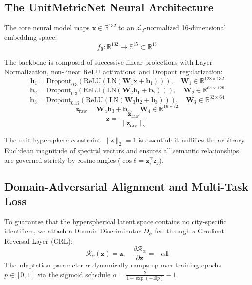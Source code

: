 \documentclass[11pt,a4paper]{article}
\begin{document}
\subsection{The UnitMetricNet Neural Architecture}
The core neural model maps $\mathbf{x} \in \mathbb{R}^{132}$ to an $\mathcal{L}_2$-normalized 16-dimensional embedding space:
\begin{equation}
    f_{\boldsymbol{\theta}}: \mathbb{R}^{132} \longrightarrow \mathbb{S}^{15} \subset \mathbb{R}^{16}
\end{equation}

The backbone is composed of successive linear projections with Layer Normalization, non-linear ReLU activations, and Dropout regularization:
\begin{equation}
    \mathbf{h}_1 = \text{Dropout}_{0.3}\left(\text{ReLU}\left(\text{LN}\left(\mathbf{W}_1 \mathbf{x} + \mathbf{b}_1\right)\right)\right), \quad \mathbf{W}_1 \in \mathbb{R}^{128 \times 132}
\end{equation}
\begin{equation}
    \mathbf{h}_2 = \text{Dropout}_{0.3}\left(\text{ReLU}\left(\text{LN}\left(\mathbf{W}_2 \mathbf{h}_1 + \mathbf{b}_2\right)\right)\right), \quad \mathbf{W}_2 \in \mathbb{R}^{64 \times 128}
\end{equation}
\begin{equation}
    \mathbf{h}_3 = \text{Dropout}_{0.15}\left(\text{ReLU}\left(\text{LN}\left(\mathbf{W}_3 \mathbf{h}_2 + \mathbf{b}_3\right)\right)\right), \quad \mathbf{W}_3 \in \mathbb{R}^{32 \times 64}
\end{equation}
\begin{equation}
    \mathbf{z}_{\text{raw}} = \mathbf{W}_4 \mathbf{h}_3 + \mathbf{b}_4, \quad \mathbf{W}_4 \in \mathbb{R}^{16 \times 32}
\end{equation}
\begin{equation}
    \mathbf{z} = \frac{\mathbf{z}_{\text{raw}}}{\|\mathbf{z}_{\text{raw}}\|_2}
\end{equation}

The unit hypersphere constraint $\|\mathbf{z}\|_2 = 1$ is essential: it nullifies the arbitrary Euclidean magnitude of spectral vectors and ensures all semantic relationships are governed strictly by cosine angles ($\cos \theta = \mathbf{z}_i^\top \mathbf{z}_j$).

\subsection{Domain-Adversarial Alignment and Multi-Task Loss}
To guarantee that the hyperspherical latent space contains no city-specific identifiers, we attach a Domain Discriminator $D_{\boldsymbol{\phi}}$ fed through a Gradient Reversal Layer (GRL):
\begin{equation}
    \mathcal{R}_{\alpha}(\mathbf{z}) = \mathbf{z}, \quad \frac{\partial \mathcal{R}_{\alpha}}{\partial \mathbf{z}} = -\alpha \mathbf{I}
\end{equation}
The adaptation parameter $\alpha$ dynamically ramps up over training epochs $p \in [0, 1]$ via the sigmoid schedule $\alpha = \frac{2}{1 + \exp(-10p)} - 1$.
\end{document}

